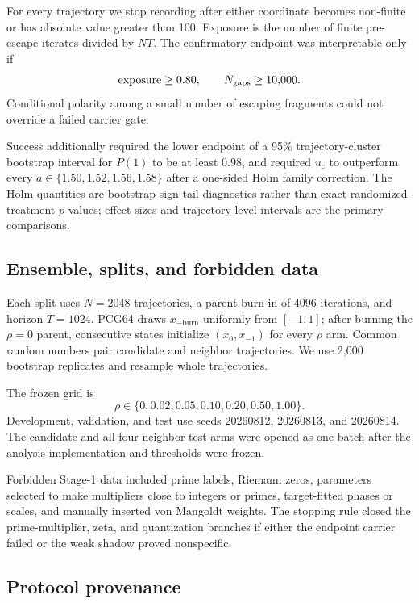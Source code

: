 \documentclass[11pt]{article}
\newcommand{\uc}{u_{\mathrm c}}
\begin{document}
For every trajectory we stop recording after either coordinate becomes
non-finite or has absolute value greater than 100. Exposure is the number of
finite pre-escape iterates divided by \(NT\). The confirmatory endpoint was
interpretable only if
\[
 \text{exposure}\geq0.80,\qquad N_{\rm gaps}\geq10{,}000.
\]
Conditional polarity among a small number of escaping fragments could not
override a failed carrier gate.

Success additionally required the lower endpoint of a 95\% trajectory-cluster
bootstrap interval for \(P(1)\) to be at least \(0.98\), and required \(\uc\)
to outperform every \(a\in\{1.50,1.52,1.56,1.58\}\) after a one-sided Holm
family correction. The Holm quantities are bootstrap sign-tail diagnostics
rather than exact randomized-treatment \(p\)-values; effect sizes and
trajectory-level intervals are the primary comparisons.

\subsection{Ensemble, splits, and forbidden data}

Each split uses \(N=2048\) trajectories, a parent burn-in of 4096 iterations,
and horizon \(T=1024\). PCG64 draws \(x_{-\mathrm{burn}}\) uniformly from
\([-1,1]\); after burning the \(\rho=0\) parent, consecutive states initialize
\((x_0,x_{-1})\) for every \(\rho\) arm. Common random numbers pair candidate
and neighbor trajectories. We use 2,000 bootstrap replicates and resample
whole trajectories.

The frozen grid is
\[
 \rho\in\{0,0.02,0.05,0.10,0.20,0.50,1.00\}.
\]
Development, validation, and test use seeds 20260812, 20260813, and 20260814.
The candidate and all four neighbor test arms were opened as one batch after
the analysis implementation and thresholds were frozen.

Forbidden Stage-1 data included prime labels, Riemann zeros, parameters
selected to make multipliers close to integers or primes, target-fitted
phases or scales, and manually inserted von Mangoldt weights. The stopping
rule closed the prime-multiplier, zeta, and quantization branches if either
the endpoint carrier failed or the weak shadow proved nonspecific.

\subsection{Protocol provenance}
\end{document}
